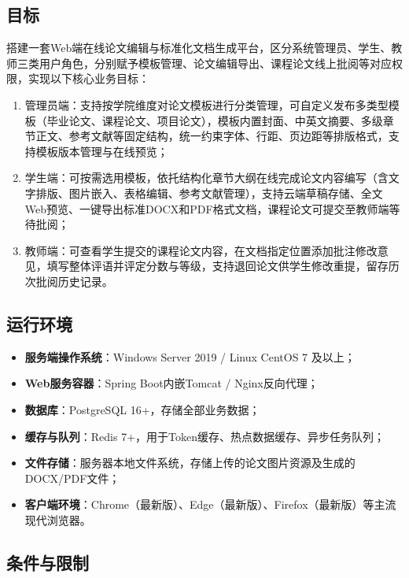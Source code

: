 \documentclass{../../softeng}
\begin{document}
\subsection{目标}

搭建一套Web端在线论文编辑与标准化文档生成平台，区分系统管理员、学生、教师三类用户角色，分别赋予模板管理、论文编辑导出、课程论文线上批阅等对应权限，实现以下核心业务目标：

\begin{enumerate}
    \item 管理员端：支持按学院维度对论文模板进行分类管理，可自定义发布多类型模板（毕业论文、课程论文、项目论文），模板内置封面、中英文摘要、多级章节正文、参考文献等固定结构，统一约束字体、行距、页边距等排版格式，支持模板版本管理与在线预览；
    \item 学生端：可按需选用模板，依托结构化章节大纲在线完成论文内容编写（含文字排版、图片嵌入、表格编辑、参考文献管理），支持云端草稿存储、全文Web预览、一键导出标准DOCX和PDF格式文档，课程论文可提交至教师端等待批阅；
    \item 教师端：可查看学生提交的课程论文内容，在文档指定位置添加批注修改意见，填写整体评语并评定分数与等级，支持退回论文供学生修改重提，留存历次批阅历史记录。
\end{enumerate}

\subsection{运行环境}

\begin{itemize}
    \item \textbf{服务端操作系统}：Windows Server 2019 / Linux CentOS 7 及以上；
    \item \textbf{Web服务容器}：Spring Boot内嵌Tomcat / Nginx反向代理；
    \item \textbf{数据库}：PostgreSQL 16+，存储全部业务数据；
    \item \textbf{缓存与队列}：Redis 7+，用于Token缓存、热点数据缓存、异步任务队列；
    \item \textbf{文件存储}：服务器本地文件系统，存储上传的论文图片资源及生成的DOCX/PDF文件；
    \item \textbf{客户端环境}：Chrome（最新版）、Edge（最新版）、Firefox（最新版）等主流现代浏览器。
\end{itemize}

\subsection{条件与限制}
\end{document}
